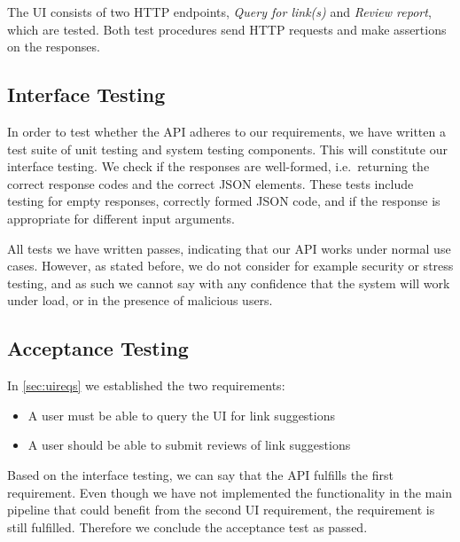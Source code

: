 The UI consists of two HTTP endpoints, \emph{Query for link(s)} and \emph{Review report}, which are tested. Both test procedures send HTTP requests and make assertions on the responses.

\subsection{Interface Testing}
In order to test whether the API adheres to our requirements, we have written a test suite of unit testing and system testing components. This will constitute our interface testing. We check if the responses are well-formed, i.e.\ returning the correct response codes and the correct JSON elements. These tests include testing for empty responses, correctly formed JSON code, and if the response is appropriate for different input arguments.

All tests we have written passes, indicating that our API works under normal use cases. However, as stated before, we do not consider for example security or stress testing, and as such we cannot say with any confidence that the system will work under load, or in the presence of malicious users.

\subsection{Acceptance Testing}
In \cref{sec:uireqs} we established the two requirements:
\begin{itemize}
	\item A user must be able to query the UI for link suggestions
	\item A user should be able to submit reviews of link suggestions
\end{itemize}

Based on the interface testing, we can say that the API fulfills the first requirement. Even though we have not implemented the functionality in the main pipeline that could benefit from the second UI requirement, the requirement is still fulfilled. Therefore we conclude the acceptance test as passed.